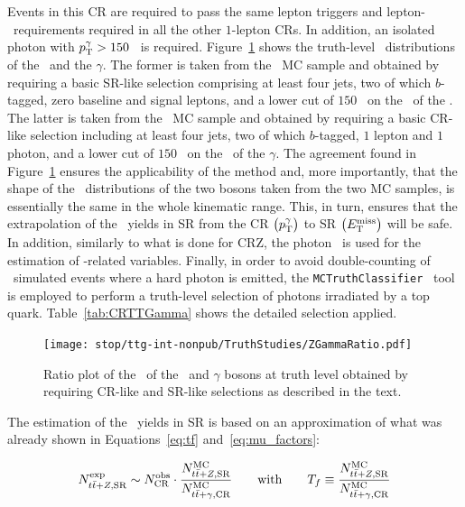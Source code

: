 		Events in this \ac{CR} are required to pass the same lepton triggers and lepton-\pt\ requirements required in all the other $1$-lepton \acp{CR}. In addition, an isolated photon with $p_{\mathrm{T}}^{\gamma} > 150$ \GeV\ is required. Figure~\ref{fig:ZGammaratio} shows the truth-level \pt\ distributions of the \Zboson\ and the $\gamma$. The former is taken from the \ttZ\ \ac{MC} sample and obtained by requiring a basic \ac{SR}-like selection comprising at least four jets, two of which $b$-tagged, zero baseline and signal leptons, and a lower cut of $150$ \GeV\ on the \pt\ of the \Zboson. The latter is taken from the \ttgamma\ \ac{MC} sample and obtained by requiring a basic \ac{CR}-like selection including at least four jets, two of which $b$-tagged, $1$ lepton and $1$ photon, and a lower cut of $150$ \GeV\ on the \pt\ of the $\gamma$. The agreement found in Figure~\ref{fig:ZGammaratio} ensures the applicability of the method and, more importantly, that the shape of the \pt\ distributions of the two bosons taken from the two \ac{MC} samples, is essentially the same in the whole kinematic range. This, in turn, ensures that the extrapolation of the \ttZ\ yields in \ac{SR} from the CR $\left(p_{\mathrm{T}}^{\gamma}\right)$ to SR $\left(E_{\mathrm{T}}^{\mathrm{miss}}\right)$ will be safe. In addition, similarly to what is done for CRZ, the photon \pt\ is used for the estimation of \met-related variables. Finally, in order to avoid double-counting of \ttbar\ simulated events where a hard photon is emitted, the \verb+MCTruthClassifier+~\cite{MCTruthClassifier} tool is employed to perform a truth-level selection of photons irradiated by a top quark. Table~\ref{tab:CRTTGamma} shows the detailed selection applied. 

		\begin{figure}[htpb]
		  \centering
		  \texttt{[image: stop/ttg-int-nonpub/TruthStudies/ZGammaRatio.pdf]}
		  \caption{Ratio plot of the \pt\ of the \Zboson\ and $\gamma$ bosons at truth level obtained by requiring \ac{CR}-like and \ac{SR}-like selections as described in the text.}
		  \label{fig:ZGammaratio}
		\end{figure}

		The estimation of the \ttZ\ yields in \ac{SR} is based on an approximation of what was already shown in Equations~\ref{eq:tf} and~\ref{eq:mu_factors}:
		
		\begin{equation}
			N_{t\bar{t}+Z,\mathrm{SR}}^{\mathrm{exp}} \sim N_{\mathrm{CR}}^{\mathrm{obs}} \cdot \frac{N_{t\bar{t}+Z,\mathrm{SR}}^{\mathrm{MC}}}{N_{t\bar{t}+\gamma,\mathrm{CR}}^{\mathrm{MC}}} \qquad \mathrm{with} \qquad T_f \equiv \frac{N_{t\bar{t}+Z,\mathrm{SR}}^{\mathrm{MC}}}{N_{t\bar{t}+\gamma,\mathrm{CR}}^{\mathrm{MC}}}
		\label{eq:ttZ_estimation}
		\end{equation}

